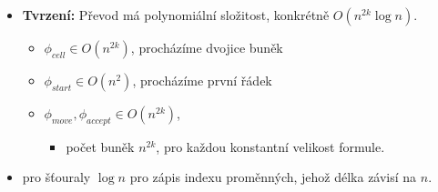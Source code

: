    \begin{frame}{}
    \begin{proofe}
    \begin{itemize}[<+->]
    \item {\bf Tvrzení:} Převod má polynomiální složitost, konkrétně $O(n^{2k}\log n)$.
    \begin{itemize}
        \item $\phi_{cell}\in O(n^{2k})$, procházíme dvojice buněk
        \item $\phi_{start}\in O(n^{2})$, procházíme první řádek
        \item $\phi_{move},\phi_{accept}\in O(n^{2k})$, 
    \begin{itemize}
    \item počet buněk $n^{2k}$, pro každou konstantní velikost formule.
    \end{itemize}
        
    \end{itemize}
    \item pro šťouraly $\log n$ pro zápis indexu proměnných, jehož délka závisí na $n$.
    \end{itemize}
    \end{proofe}
    \end{frame}
    
    

    